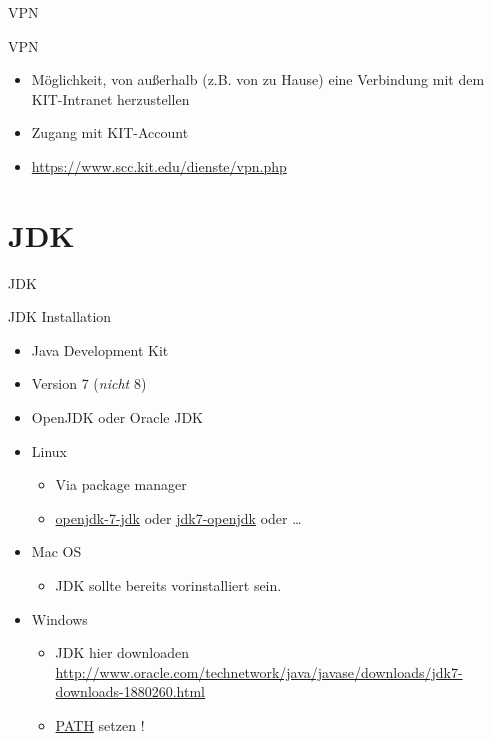 \documentclass[18pt]{beamer}
\begin{document}
\begin{frame}{VPN}
    \begin{block}{VPN}
        \begin{itemize}
            \item Möglichkeit, von außerhalb (z.B. von zu Hause) eine Verbindung mit dem KIT-Intranet herzustellen
            \item Zugang mit KIT-Account
            \item \url{https://www.scc.kit.edu/dienste/vpn.php}
        \end{itemize}
    \end{block}
\end{frame}

\section{JDK}

\begin{frame}{JDK}
    \begin{block}{JDK Installation}
        \begin{itemize}
            \item Java Development Kit
            \item Version 7 (\textit{nicht} 8)
            \item OpenJDK oder Oracle JDK
            \pause
            \item Linux
            \begin{itemize}
                \item Via package manager
                \item \url{openjdk-7-jdk} oder \url{jdk7-openjdk} oder \dots
            \end{itemize}
            \item Mac OS
            \begin{itemize}
                \item JDK sollte bereits vorinstalliert sein.
            \end{itemize}
            \item Windows
            \begin{itemize}
                \item JDK hier downloaden\\
                \url{http://www.oracle.com/technetwork/java/javase/downloads/jdk7-downloads-1880260.html}
                \item \url{PATH} setzen !
            \end{itemize}
        \end{itemize}
    \end{block}
\end{frame}
\end{document}
